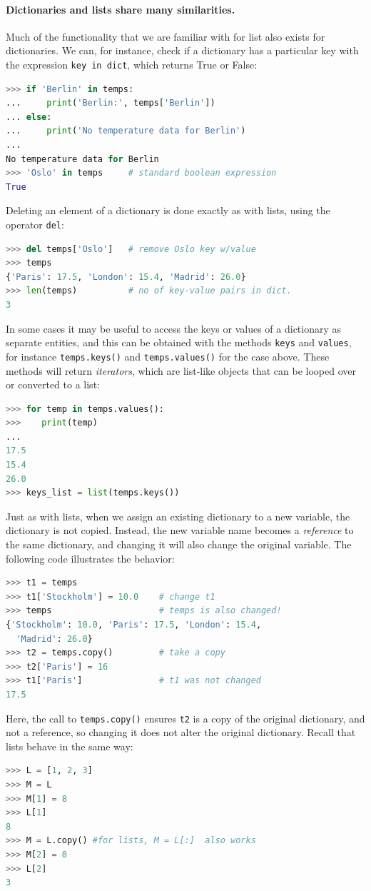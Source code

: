 \documentclass[graybox,envcountchap,sectrefs,final]{svmonodo}
\begin{document}
\paragraph{Dictionaries and lists share many similarities.}
Much of the functionality that we are familiar with for list also exists for dictionaries. We can, for instance,
check if a dictionary has a particular key with the expression \texttt{key in dict}, which returns True or False:
\begin{lstlisting}[language=Python,style=blue1]
>>> if 'Berlin' in temps:
...     print('Berlin:', temps['Berlin'])
... else:
...     print('No temperature data for Berlin')
...
No temperature data for Berlin
>>> 'Oslo' in temps     # standard boolean expression
True
\end{lstlisting}
Deleting an element of a dictionary is done exactly as with lists, using the operator \texttt{del}:
\begin{lstlisting}[language=Python,style=blue1]
>>> del temps['Oslo']   # remove Oslo key w/value
>>> temps
{'Paris': 17.5, 'London': 15.4, 'Madrid': 26.0}
>>> len(temps)          # no of key-value pairs in dict.
3
\end{lstlisting}
In some cases it may be useful to access the keys or values of a dictionary as separate entities, and this can be
obtained with the methods \texttt{keys} and \texttt{values}, for instance
\texttt{temps.keys()} and \texttt{temps.values()} for the case above. These methods will return \emph{iterators}, which are
list-like objects that can be looped over or converted to a list:
\begin{lstlisting}[language=Python,style=blue1]
>>> for temp in temps.values():
>>>    print(temp)
...
17.5
15.4
26.0
>>> keys_list = list(temps.keys())
\end{lstlisting}

Just as with lists, when we assign an existing dictionary to a new variable, the dictionary is not copied. Instead,
the new variable name becomes a \emph{reference} to the same dictionary, and changing it will also change the original
variable. The following code illustrates the behavior:
\begin{lstlisting}[language=Python,style=blue1]
>>> t1 = temps
>>> t1['Stockholm'] = 10.0    # change t1
>>> temps                     # temps is also changed!
{'Stockholm': 10.0, 'Paris': 17.5, 'London': 15.4,
  'Madrid': 26.0}
>>> t2 = temps.copy()         # take a copy
>>> t2['Paris'] = 16
>>> t1['Paris']               # t1 was not changed
17.5
\end{lstlisting}
Here, the call to \texttt{temps.copy()} ensures \texttt{t2} is a copy of the original dictionary, and not a reference, so changing
it does not alter the original dictionary. Recall that lists behave in the same way:
\begin{lstlisting}[language=Python,style=blue1]
>>> L = [1, 2, 3]
>>> M = L
>>> M[1] = 8
>>> L[1]
8
>>> M = L.copy() #for lists, M = L[:]  also works
>>> M[2] = 0
>>> L[2]
3
\end{lstlisting}
\end{document}

